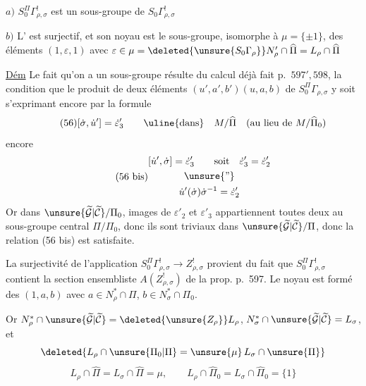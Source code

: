 $a)$ $S_0^\Pi\Gamma_{\rho,\sigma}^{!}$ est un sous-groupe de
$S_0\Gamma_{\rho,\sigma}^{!}$

$b)$ L' 
est surjectif, et son noyau est le sous-groupe, isomorphe à
$\mu=\{\pm1\}$, des éléments $(1,\varepsilon,1)$ avec
$\varepsilon\in\mu=\deleted{\unsure{S_0\Gamma_{\rho}}}
N'_\rho\cap\widehat\Pi=L_\rho\cap\widehat\Pi$


\uline{Dém} Le fait qu'on a un sous-groupe résulte du calcul déjà fait p.\ $597',598$, la condition que le produit de deux éléments $(u',a',b')(u,a,b)$ de $S_0^{\Pi}\Gamma_{\rho,\sigma}$ y soit s'exprimant encore par la formule
\[
\tag{56}
[\dot\sigma,\dot u']=\dot\varepsilon'_3
\qquad\text{\uline{dans}}\quad M/\widehat\Pi
\quad(\text{au lieu de }M/\widehat\Pi_0)
\]
 encore
\[
\tag{56 bis}
\begin{gathered}
[\dot u',\dot\sigma]=\dot\varepsilon'_3
\qquad\text{soit}\quad \dot\varepsilon'_3=\dot\varepsilon'_2\\
\unsure{\text{''}}\\
\dot u'(\dot\sigma)\dot\sigma^{-1}=\dot\varepsilon'_2
\end{gathered}
\]
Or dans $\unsure{\widetilde{\mathcal G}|\widetilde{\mathcal C}}/\Pi_0$,  images de $\varepsilon'_2$ et $\varepsilon'_3$ appartiennent toutes deux au sous-groupe central $\Pi/\Pi_0$, donc ils sont triviaux dans $\unsure{\widetilde{\mathcal G}|\widetilde{\mathcal C}}/\Pi$, donc la relation (56 bis) est  satisfaite.

La surjectivité de l'application $S_0^\Pi\Gamma^!_{\rho,\sigma}\longrightarrow Z^!_{\rho,\sigma}$ provient du fait que $S_0^\Pi\Gamma^!_{\rho,\sigma}$ contient la section ensembliste $A(Z^!_{\rho,\sigma})$ de la prop. p.\ 597. Le noyau est formé des  $(1,a,b)$ avec $a\in N_\rho^*\cap\Pi$, $b\in N_\sigma^*\cap\Pi_0$.

Or $N_\rho^*\cap\unsure{\widetilde{\mathcal G}|\widetilde{\mathcal C}}=\deleted{\unsure{Z_\rho}}L_\rho$, $N_\sigma^*\cap\unsure{\widetilde{\mathcal G}|\widetilde{\mathcal C}}=L_\sigma$, et
\[
\deleted{L_\rho\cap\unsure{\Pi_0|\Pi}=\unsure{\mu}\,L_\sigma\cap\unsure{\Pi}}
\]
\[
\tag{57}
L_\rho\cap\widehat\Pi=L_\sigma\cap\widehat\Pi=\mu,
\qquad L_\rho\cap\widehat\Pi_0=L_\sigma\cap\widehat\Pi_0=\{1\}
\]

